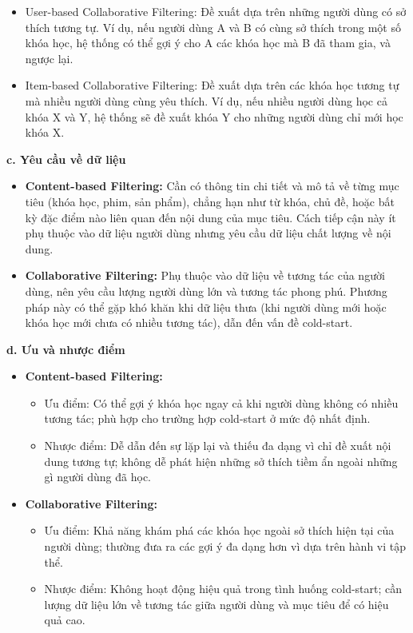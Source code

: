 \begin{itemize}
    \begin{itemize}
        \item User-based Collaborative Filtering: Đề xuất dựa trên những người dùng có sở thích tương tự. Ví dụ, nếu người dùng A và B có cùng sở thích trong một số khóa học, hệ thống có thể gợi ý cho A các khóa học mà B đã tham gia, và ngược lại.
        \item Item-based Collaborative Filtering: Đề xuất dựa trên các khóa học tương tự mà nhiều người dùng cùng yêu thích. Ví dụ, nếu nhiều người dùng học cả khóa X và Y, hệ thống sẽ đề xuất khóa Y cho những người dùng chỉ mới học khóa X.
    \end{itemize}
\end{itemize}
\textbf{c. Yêu cầu về dữ liệu}
\begin{itemize}
    \item \textbf{Content-based Filtering:} Cần có thông tin chi tiết và mô tả về từng mục tiêu (khóa học, phim, sản phẩm), chẳng hạn như từ khóa, chủ đề, hoặc bất kỳ đặc điểm nào liên quan đến nội dung của mục tiêu. Cách tiếp cận này ít phụ thuộc vào dữ liệu người dùng nhưng yêu cầu dữ liệu chất lượng về nội dung.
    \item \textbf{Collaborative Filtering:} Phụ thuộc vào dữ liệu về tương tác của người dùng, nên yêu cầu lượng người dùng lớn và tương tác phong phú. Phương pháp này có thể gặp khó khăn khi dữ liệu thưa (khi người dùng mới hoặc khóa học mới chưa có nhiều tương tác), dẫn đến vấn đề cold-start.
\end{itemize}
\textbf{d. Ưu và nhược điểm}
\begin{itemize}
    \item \textbf{Content-based Filtering:}
    \begin{itemize}
        \item Ưu điểm: Có thể gợi ý khóa học ngay cả khi người dùng không có nhiều tương tác; phù hợp cho trường hợp cold-start ở mức độ nhất định.
        \item Nhược điểm: Dễ dẫn đến sự lặp lại và thiếu đa dạng vì chỉ đề xuất nội dung tương tự; không dễ phát hiện những sở thích tiềm ẩn ngoài những gì người dùng đã học.
    \end{itemize}
    \item \textbf{Collaborative Filtering:}
    \begin{itemize}
        \item Ưu điểm: Khả năng khám phá các khóa học ngoài sở thích hiện tại của người dùng; thường đưa ra các gợi ý đa dạng hơn vì dựa trên hành vi tập thể.
        \item Nhược điểm: Không hoạt động hiệu quả trong tình huống cold-start; cần lượng dữ liệu lớn về tương tác giữa người dùng và mục tiêu để có hiệu quả cao.
    \end{itemize}
\end{itemize}
